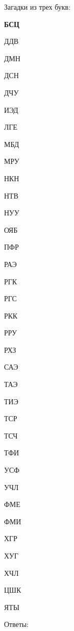 Загадки из трех букв:
\begin{multicols}{4}
{\bf
БСЦ

ДДВ

ДМН

ДСН

ДЧУ

ИЭД

ЛГЕ

МБД

МРУ

НКН

НТВ

НУУ

ОЯБ

ПФР

РАЭ

РГК

РГС

РКК

РРУ

РХЗ

САЭ

ТАЭ

ТИЭ

ТСР

ТСЧ

ТФИ

УСФ

УЧЛ

ФМЕ

ФМИ

ХГР

ХУГ

ХЧЛ

ЦШК

ЯТЫ
}
\end{multicols}

Ответы:


